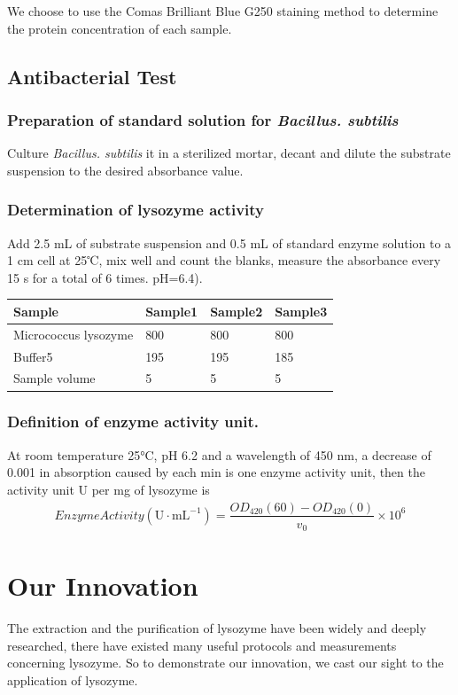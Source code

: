 We choose to use the Comas Brilliant Blue G250 staining method to
determine the protein concentration of each sample.

\hypertarget{antibacterial-test}{%
	\subsection{Antibacterial Test}\label{antibacterial-test}}

\subsubsection{Preparation of standard solution for \textit{Bacillus. subtilis}}

Culture \textit{Bacillus. subtilis} it in a sterilized mortar, decant and dilute the substrate suspension to the desired absorbance value.

\subsubsection{Determination of lysozyme activity}

Add 2.5 mL of substrate suspension and 0.5 mL of standard enzyme
solution to a 1 cm cell at 25℃, mix well and count the blanks, measure
the absorbance every 15 s for a total of 6 times. pH=6.4).

\begin{longtable}[]{@{}llll@{}}
	\toprule
	Sample & Sample1 & Sample2 & Sample3\tabularnewline
	\midrule
	\endhead
	Micrococcus lysozyme & 800 & 800 & 800\tabularnewline
	Buffer5 & 195 & 195 & 185\tabularnewline
	Sample volume & 5 & 5 & 5\tabularnewline
	\bottomrule
\end{longtable}

\subsubsection{Definition of enzyme activity unit.}

At room temperature 25°C, pH 6.2 and a wavelength of 450 nm, a
decrease of 0.001 in absorption caused by each min is one enzyme
activity unit, then the activity unit U per mg of lysozyme is
\begin{gather*}
	Enzyme Activity(\mathrm{U\cdot mL^{-1}})=\dfrac{OD_{420}(60)-OD_{420}(0)}{v_0}\times 10^{6}
\end{gather*}


\section{Our Innovation}
The extraction and the purification of lysozyme have been widely and deeply researched, there have existed many useful protocols and measurements concerning lysozyme. So to demonstrate our innovation, we cast our sight to the application of lysozyme. 

